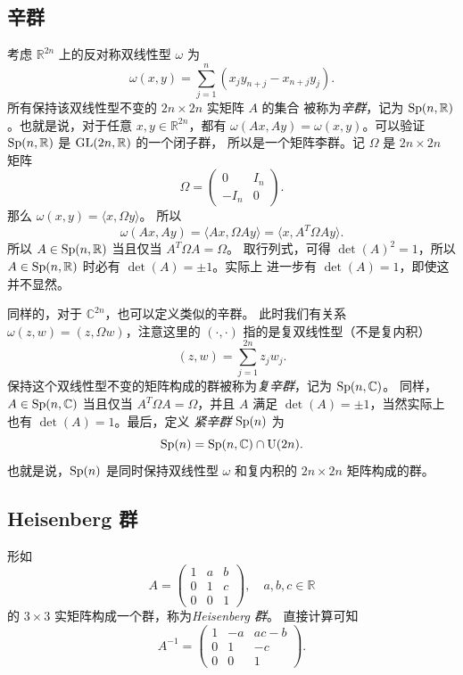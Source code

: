 \subsection{辛群}

考虑 $\mathbb{R}^{2n}$ 上的反对称双线性型 $\omega$ 为
\begin{equation}
  \omega(x,y)=\sum_{j=1}^n (x_jy_{n+j}-x_{n+j}y_j ).
\end{equation}
所有保持该双线性型不变的 $2n\times 2n$ 实矩阵 $A$ 的集合
被称为\emph{辛群}，记为 $\operatorname{Sp}(n,\mathbb{R})$。也就是说，对于任意 $x,y\in \mathbb{R}^{2n}$，都有
$\omega(Ax,Ay)=\omega(x,y)$。可以验证 $\operatorname{Sp}(n,\mathbb{R})$ 是 $\operatorname{GL}(2n,\mathbb{R})$ 的一个闭子群，
所以是一个矩阵李群。记 $\Omega$ 是 $2n\times 2n$ 矩阵
\[
  \Omega=\begin{pmatrix}
    0 & I_n \\
    -I_n & 0
  \end{pmatrix}.
\]
那么 $\omega(x,y)=\langle x,\Omega y\rangle$。
所以
\[
  \omega(Ax,Ay)=\langle Ax,\Omega Ay\rangle=\langle x,A^T\Omega A y\rangle.
\]
所以 $A\in \operatorname{Sp}(n,\mathbb{R})$ 当且仅当 $A^T\Omega A=\Omega$。
取行列式，可得 $\det(A)^2=1$，所以
$A\in\operatorname{Sp}(n,\mathbb{R})$ 时必有 $\det(A)=\pm 1$。实际上
进一步有 $\det(A)=1$，即使这并不显然。

同样的，对于 $\mathbb{C}^{2n}$，也可以定义类似的辛群。
此时我们有关系 $\omega(z,w)=(z,\Omega w)$，注意这里的 $(\cdot,\cdot)$
指的是复双线性型（不是复内积）
\[
  (z,w)=\sum_{j=1}^{2n} z_j w_j.
\]
保持这个双线性型不变的矩阵构成的群被称为\emph{复辛群}，记为 $\operatorname{Sp}(n,\mathbb{C})$。
同样，$A\in \operatorname{Sp}(n,\mathbb{C})$ 当且仅当 $A^T\Omega A=\Omega$，并且 $A$
满足 $\det(A)=\pm 1$，当然实际上也有 $\det(A)=1$。最后，定义
\emph{紧辛群} $\operatorname{Sp}(n)$ 为
\[
  \operatorname{Sp}(n)=\operatorname{Sp}(n,\mathbb{C})\cap \operatorname{U}(2n).
\]
也就是说，$\operatorname{Sp}(n)$ 是同时保持双线性型 $\omega$ 和复内积的 $2n\times 2n$ 矩阵构成的群。

\subsection{Heisenberg 群}

形如
\[
  A=\begin{pmatrix}
    1 & a & b \\
    0 & 1 & c \\
    0 & 0 & 1
  \end{pmatrix}, \quad a,b,c\in \mathbb{R}
\]
的 $3\times 3$ 实矩阵构成一个群，称为\emph{Heisenberg 群}。
直接计算可知
\[
  A^{-1}=\begin{pmatrix}
    1 & -a & ac - b \\
    0 & 1 & -c \\
    0 & 0 & 1
  \end{pmatrix}.
\]


